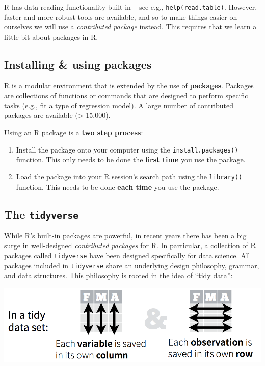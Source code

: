 \documentclass[
]{book}
\begin{document}
R has data reading functionality built-in -- see e.g.,
\texttt{help(read.table)}. However, faster and more robust tools are
available, and so to make things easier on ourselves we will use a
\emph{contributed package} instead. This requires that we
learn a little bit about packages in R.

\hypertarget{installing-using-packages}{%
\subsection{Installing \& using packages}\label{installing-using-packages}}

R is a modular environment that is extended by the use of \textbf{packages}.
Packages are collections of functions or commands that are designed to
perform specific tasks (e.g., fit a type of regression model). A large
number of contributed packages are available (\textgreater{} 15,000).

Using an R package is a \textbf{two step process}:

\begin{enumerate}
\def\labelenumi{\arabic{enumi}.}
\item
  Install the package onto your computer using the
  \texttt{install.packages()} function. This only needs to
  be done the \textbf{first time} you use the package.
\item
  Load the package into your R session's search path
  using the \texttt{library()} function. This needs to be done
  \textbf{each time} you use the package.
\end{enumerate}

\hypertarget{the-tidyverse}{%
\subsection{\texorpdfstring{The \texttt{tidyverse}}{The tidyverse}}\label{the-tidyverse}}

While R's built-in packages are powerful, in recent years there has
been a big surge in well-designed \emph{contributed packages} for R. In
particular, a collection of R packages called
\href{https://www.tidyverse.org/}{\texttt{tidyverse}} have been
designed specifically for data science. All packages included in
\texttt{tidyverse} share an underlying design philosophy, grammar, and
data structures. This philosophy is rooted in the idea of ``tidy data'':

\includegraphics{R/Rintro/images/tidy_data.png}
\end{document}
